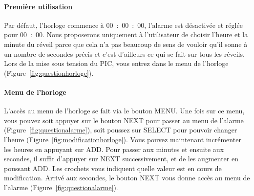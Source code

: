 \documentclass[12pt,a4paper]{article}
\begin{document}
\paragraph{Première utilisation}
Par défaut, l'horloge commence à 00~:~00~:~00, l'alarme est désactivée et réglée pour 00~:~00. Nous proposerons uniquement à l'utilisateur de choisir l'heure et la minute du réveil parce que cela n'a pas beaucoup de sens de vouloir qu'il sonne à un nombre de secondes précis et c'est d'ailleurs ce qui se fait sur tous les réveils.  Lors de la mise sous tension du PIC, vous entrez dans le menu de l'horloge (Figure~\ref{fig:questionhorloge}).

\paragraph{Menu de l'horloge} L'accès au menu de l'horloge se fait via le bouton MENU. Une fois sur ce menu, vous pouvez soit appuyer sur le bouton NEXT pour passer au menu de l'alarme (Figure~\ref{fig:questionalarme}), soit poussez sur SELECT pour pouvoir changer l'heure (Figure~\ref{fig:modificationhorloge}).
Vous pouvez maintenant incrémenter les heures en appuyant sur ADD. Pour passer aux minutes et ensuite aux secondes, il suffit d'appuyer sur NEXT successivement, et de les augmenter en poussant ADD. Les crochets vous indiquent quelle valeur est en cours de modification.
Arrivé aux secondes, le bouton NEXT vous donne accès au menu de l'alarme (Figure~\ref{fig:questionalarme}).
\end{document}
